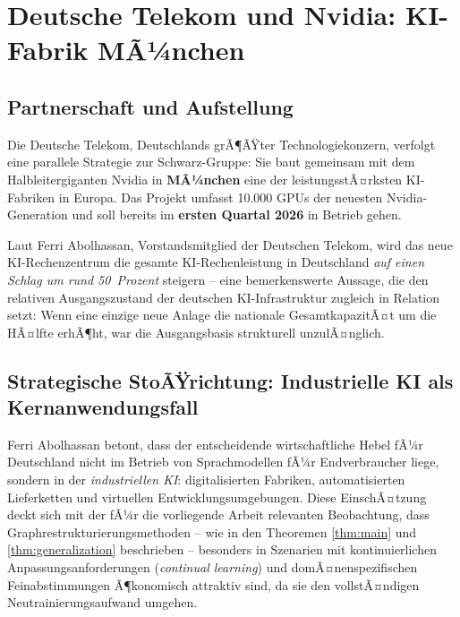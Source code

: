 ﻿\documentclass[12pt, a4paper, openany]{report}
\begin{document}
\section{Deutsche Telekom und Nvidia: KI-Fabrik MÃ¼nchen}
\label{sec:telekom_nvidia}

\subsection{Partnerschaft und Aufstellung}

Die Deutsche Telekom, Deutschlands grÃ¶ÃŸter Technologiekonzern, verfolgt
eine parallele Strategie zur Schwarz-Gruppe: Sie baut gemeinsam mit dem
Halbleitergiganten Nvidia in \textbf{MÃ¼nchen} eine der leistungsstÃ¤rksten
KI-Fabriken in Europa. Das Projekt umfasst 10.000 GPUs der neuesten
Nvidia-Generation und soll bereits im \textbf{ersten Quartal 2026} in
Betrieb gehen.

Laut Ferri Abolhassan, Vorstandsmitglied der Deutschen Telekom, wird das
neue KI-Rechenzentrum die gesamte KI-Rechenleistung in Deutschland
\emph{auf einen Schlag um rund 50~Prozent} steigern -- eine bemerkenswerte
Aussage, die den relativen Ausgangszustand der deutschen KI-Infrastruktur
zugleich in Relation setzt: Wenn eine einzige neue Anlage die nationale
GesamtkapazitÃ¤t um die HÃ¤lfte erhÃ¶ht, war die Ausgangsbasis strukturell
unzulÃ¤nglich.

\subsection{Strategische StoÃŸrichtung: Industrielle KI als Kernanwendungsfall}

Ferri Abolhassan betont, dass der entscheidende wirtschaftliche Hebel fÃ¼r
Deutschland nicht im Betrieb von Sprachmodellen fÃ¼r Endverbraucher liege,
sondern in der \emph{industriellen KI}: digitalisierten Fabriken,
automatisierten Lieferketten und virtuellen Entwicklungsumgebungen. Diese
EinschÃ¤tzung deckt sich mit der fÃ¼r die vorliegende Arbeit relevanten
Beobachtung, dass Graphrestrukturierungsmethoden -- wie in den Theoremen
\ref{thm:main} und \ref{thm:generalization} beschrieben -- besonders in
Szenarien mit kontinuierlichen Anpassungsanforderungen
(\textit{continual learning}) und domÃ¤nenspezifischen Feinabstimmungen
Ã¶konomisch attraktiv sind, da sie den vollstÃ¤ndigen Neutrainierungsaufwand
umgehen.
\end{document}
